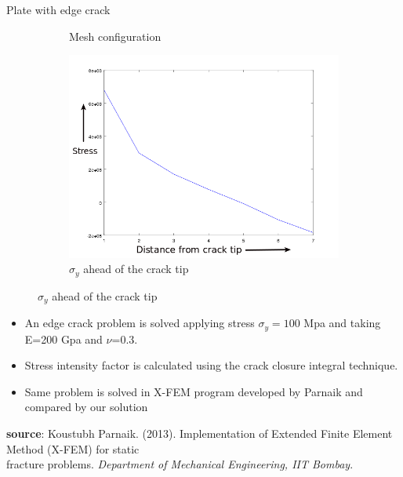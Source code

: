 \documentclass{beamer}
\begin{document}
\begin{frame}[t,fragile]{Plate with edge crack}
\begin{figure}
\begin{subfigure}{.2\textwidth}
            \caption{\scriptsize Mesh configuration}
    \end{subfigure}
    \hspace{1pt}
    \begin{subfigure}{.5\textwidth}
        \includegraphics[scale=.25]{onlystress}
        \vspace{-5pt}
         \caption{\scriptsize $\sigma_y$ ahead of the crack tip}
    \end{subfigure}
\end{figure}
    \vspace{-10pt}
\begin{itemize}
        \scriptsize
    \item An edge crack problem is solved applying stress $\sigma_y=100$ Mpa and taking E=200 Gpa and $\nu$=0.3.
    \item Stress intensity factor is calculated using the crack closure integral technique. 
    \item Same problem is solved in X-FEM program developed by Parnaik and compared by our solution 
\end{itemize}
\tiny
   \hspace{15pt}
   \textbf{source}:  Koustubh Parnaik. (2013). Implementation of Extended Finite Element Method (X-FEM) for static\\
   \hspace{15pt}fracture problems.
\emph{Department of Mechanical Engineering, IIT Bombay}.

\end{frame}
\end{document}
